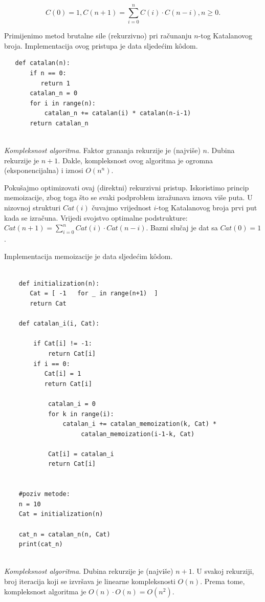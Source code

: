  $$C(0) = 1, C(n+1) = \sum_{i=0}^{n} C(i) \cdot C(n-i), n \geq  0.$$
 
 Primijenimo metod brutalne sile (rekurzivno) pri računanju $n$-tog Katalanovog broja. Implementacija ovog pristupa je data sljedećim k\^odom. 
 
 \begin{verbatim}
   def catalan(n):
       if n == 0:
          return 1
       catalan_n = 0 
       for i in range(n): 
           catalan_n += catalan(i) * catalan(n-i-1) 
       return catalan_n
        
 \end{verbatim}
  
  \emph{Kompleksnost algoritma}. Faktor grananja rekurzije je (najviše) $n$. Dubina rekurzije je $n+1$. Dakle, kompleksnost ovog algoritma je ogromna (eksponencijalna) i iznosi $O(n^n)$. 

Pokušajmo optimizovati ovaj (direktni) rekurzivni pristup. Iskoristimo princip memoizacije, zbog toga što se svaki podproblem izražunava iznova više puta. U nizovnoj strukturi $Cat(i)$ čuvajmo vrijednost $i$-tog Katalanovog broja prvi put kada se izračuna.  Vrijedi svojstvo optimalne podstrukture: $Cat(n+1) = \sum_{i=0}^{n} Cat(i) \cdot Cat(n-i).$ Bazni slučaj je dat sa $Cat(0) =1$.

Implementacija memoizacije je data sljedećim k\^odom.

  \begin{verbatim}
	
	def initialization(n):
	   Cat = [ -1   for _ in range(n+1)  ] 
	   return Cat 
	
	def catalan_i(i, Cat): 
	
	    if Cat[i] != -1:
	        return Cat[i]
	    if i == 0: 
	       Cat[i] = 1
	       return Cat[i] 
     
            catalan_i = 0
            for k in range(i): 
                catalan_i += catalan_memoization(k, Cat) *
                     catalan_memoization(i-1-k, Cat)
    
            Cat[i] = catalan_i
            return Cat[i]
    
	   
	#poziv metode:
	n = 10
	Cat = initialization(n) 
	
	cat_n = catalan_n(n, Cat) 
	print(cat_n)
	
\end{verbatim}  

\emph{Kompleksnost algoritma}. Dubina rekurzije je (najviše) $n+1$. U svakoj rekurziji, broj iteracija koji se izvršava je linearne kompleksnosti $O(n)$. Prema tome, kompleksnost algoritma je $O(n) \cdot O(n) = O(n^2)$. 



